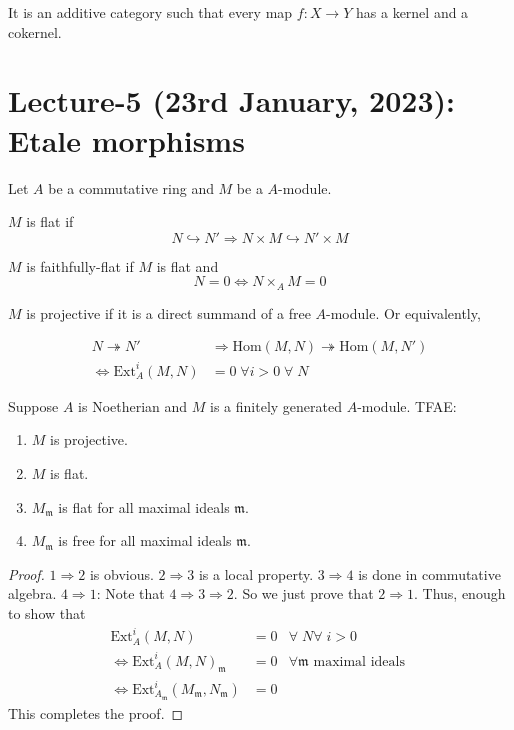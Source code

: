 \documentclass[oneside, 12pt, ]{scrbook}
\newcommand{\m}{\mathfrak{m}}
\newcommand{\Hom}{\mathrm{Hom}}
\theoremstyle{theorem}
\begin{document}
\begin{definition}
It is an additive category such that every map $f: X \rightarrow Y$ has a kernel and a cokernel.
\end{definition}


\chapter{Lecture-5 (23rd January, 2023): Etale morphisms}

Let $A$ be a commutative ring and $M$ be a $A$-module. 

\begin{definition}
$M$ is flat if $$N \hookrightarrow N' \Rightarrow N \times M \hookrightarrow N' \times M$$
\end{definition}

\begin{definition}
$M$ is faithfully-flat if $M$ is flat and  $$N =0 \Leftrightarrow N \times_{A} M =0$$
\end{definition}

\begin{definition}
$M$ is projective if it is a direct summand of a free $A$-module. Or equivalently,

\begin{align*}
N \twoheadrightarrow N' &\Rightarrow \Hom(M, N) \twoheadrightarrow \Hom(M, N')\\
\Leftrightarrow \mathrm{Ext}_{A}^{i} (M,N) &= 0 \; \forall i >0 \; \forall \; N
\end{align*}
\end{definition}

\begin{lemma}
Suppose $A$ is Noetherian and $M$ is a finitely generated $A$-module. TFAE: 
\begin{enumerate}
\item $M$ is projective.
\item $M$ is flat.
\item $M_{\m}$ is flat for all maximal ideals $\m$.
\item $M_{\m}$ is free for all maximal ideals $\m$.
\end{enumerate}
\end{lemma}

\begin{proof}
$1 \Rightarrow 2$ is obvious. $2\Rightarrow 3$ is a local property. $3 \Rightarrow 4$ is done in commutative algebra. $4 \Rightarrow 1$: Note that $4 \Rightarrow 3 \Rightarrow 2$. So we just prove that $2 \Rightarrow 1$. Thus, enough to show that 
\begin{align*}
\mathrm{Ext}_{A}^i (M,N) &=0 & \forall \; N  \forall \; i>0 \\
\Leftrightarrow \mathrm{Ext}_{A}^i(M,N)_{\m} &= 0 &\forall \m \text{ maximal ideals } \\
\Leftrightarrow \mathrm{Ext}_{A_{\m}}^i (M_{\m}, N_{\m}) &= 0
\end{align*}
This completes the proof.
\end{proof}
\end{document}
